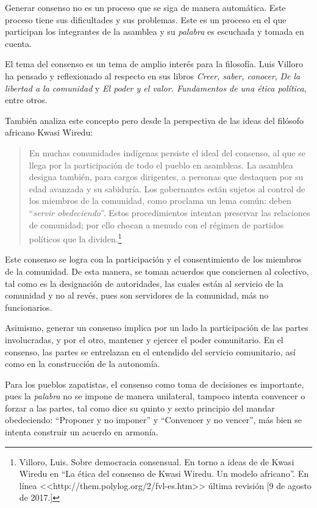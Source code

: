 \documentclass[oneside]{book}
\begin{document}
Generar consenso no es un proceso que se siga de manera automática. Este proceso tiene sus dificultades y sus problemas. Este es un proceso en el que participan los integrantes de la asamblea y su \textit{palabra} es escuchada y tomada en cuenta.

El tema del consenso es un tema de amplio interés para la filosofía. Luis Villoro ha pensado y reflexionado al respecto en sus libros \textit{Creer, saber, conocer}\cite{vill}, \textit{De la libertad a la comunidad}\cite{vi} y \textit{El poder y el valor. Fundamentos de una ética política}\cite{vil}, entre otros.

También analiza este concepto pero desde la perspectiva de las ideas del filósofo africano Kwasi Wiredu:
\begin{quote}
    En muchas comunidades indígenas persiste el ideal del consenso, al que se llega por la participación de todo el pueblo en asambleas. La asamblea designa también, para cargos dirigentes, a personas que destaquen por su edad avanzada y su sabiduría. Los gobernantes están sujetos al control de los miembros de la comunidad, como proclama un lema común: deben “\textit{servir obedeciendo}”. Estos procedimientos intentan preservar las relaciones de comunidad; por ello chocan a menudo con el régimen de partidos políticos que la dividen.\footnote{Villoro, Luis. Sobre democracia consensual. En torno a ideas de de Kwasi Wiredu en ``La ética del consenso de Kwasi Wiredu. Un modelo africano''. En línea <<http://them.polylog.org/2/fvl-es.htm>> última revisión [9 de agosto de 2017.]}
\end{quote}

Este consenso se logra con la participación y el consentimiento de los miembros de la comunidad. De esta manera, se toman acuerdos que conciernen al colectivo, tal como es la designación de autoridades, las cuales están al servicio de la comunidad y no al revés, pues son servidores de la comunidad, más no funcionarios.

Asimismo, generar un consenso implica por un lado la participación de las partes involucradas, y por el otro, mantener y ejercer el poder comunitario. En el consenso, las partes se entrelazan en el entendido del servicio comunitario, así como en la construcción de la autonomía.

Para los pueblos zapatistas, el consenso como toma de decisiones es importante, pues la \textit{palabra} no se impone de manera unilateral, tampoco intenta convencer o forzar a las partes, tal como dice su quinto y sexto principio del mandar obedeciendo: “Proponer y no imponer” y “Convencer y no vencer”, más bien se intenta construir un acuerdo en armonía.%
\end{document}
